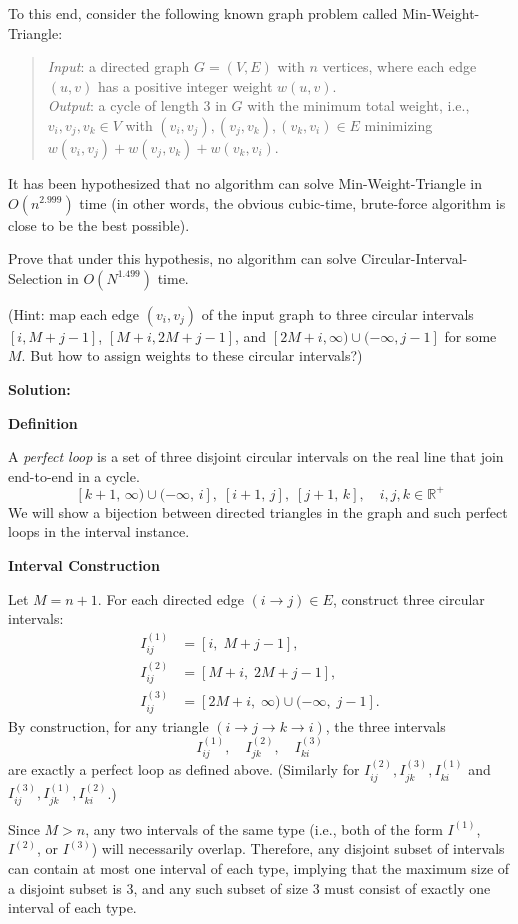 \documentclass[11pt]{article}
\begin{document}
\begin{description}
To this end, consider the following known graph problem called {\sc Min-Weight-Triangle}:
\begin{quote}
\emph{Input}: a directed graph $G=(V,E)$ with $n$ vertices, where each edge $(u,v)$ has a positive  integer weight $w(u,v)$.\\[2pt]
\emph{Output}: a cycle of length 3 in $G$ with the minimum total weight, i.e., $v_i,v_j,v_k\in V$
with $(v_i,v_j),(v_j,v_k),(v_k,v_i)\in E$ minimizing $w(v_i,v_j)+w(v_j,v_k)+w(v_k,v_i)$.
\end{quote}
It has been hypothesized that no algorithm can solve {\sc Min-Weight-Triangle}
in $O(n^{2.999})$ time (in other words, the obvious cubic-time, brute-force algorithm is close to be the best possible).

Prove that under this hypothesis, no algorithm can solve {\sc Circular-Interval-Selection}
in $O(N^{1.499})$ time.

(Hint: map each edge $(v_i,v_j)$ of the input graph to three circular intervals $[i,M+j-1]$, $[M+i,2M+j-1]$, and $[2M+i,\infty)\cup (-\infty,j-1]$ for some $M$.  But how to assign weights to these circular intervals?)

\newpage
\textbf{Solution:}

\textbf{Definition}

A \emph{perfect loop} is a set of three disjoint circular intervals on the real line that join end-to-end in a cycle.
\[
  [k+1,\,\infty) \cup (-\infty,\,i],\;[i+1,\,j],\;[j+1,\,k], \quad i,j,k\in \mathbb{R^+}
\]
We will show a bijection between directed triangles in the graph and such perfect loops in the interval instance.

\textbf{Interval Construction}

Let $M = n + 1$.  For each directed edge $(i \to j) \in E$, construct three circular intervals:
\begin{align*}
  I_{ij}^{(1)} &= [i,\; M + j - 1], \\
  I_{ij}^{(2)} &= [M + i,\; 2M + j - 1], \\
  I_{ij}^{(3)} &= [2M + i,\; \infty) \cup (-\infty,\; j - 1].
\end{align*}
By construction, for any triangle $(i \to j \to k \to i)$, the three intervals
\[
  I_{ij}^{(1)},\quad I_{jk}^{(2)},\quad I_{ki}^{(3)}
\]
are exactly a perfect loop as defined above. (Similarly for $I_{ij}^{(2)},I_{jk}^{(3)},I_{ki}^{(1)}$ and $I_{ij}^{(3)},I_{jk}^{(1)},I_{ki}^{(2)}$.)

Since \( M > n \), any two intervals of the same type (i.e., both of the form \( I^{(1)} \), \( I^{(2)} \), or \( I^{(3)} \)) will necessarily overlap. Therefore, any disjoint subset of intervals can contain at most one interval of each type, implying that the maximum size of a disjoint subset is 3, and any such subset of size 3 must consist of exactly one interval of each type.


\end{description}
\end{document}
